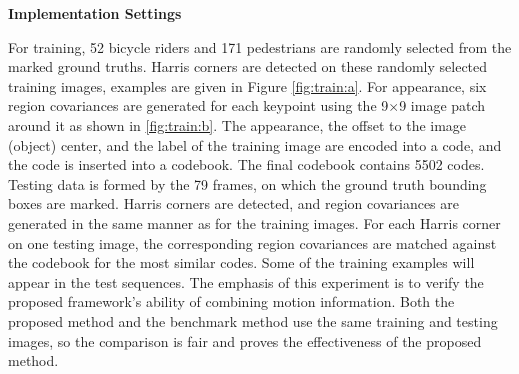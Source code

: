 \textbf{Implementation Settings}

For training, 52  bicycle riders and 171  pedestrians are randomly selected from the marked ground truths. Harris corners are detected on these randomly selected training images, examples are given in Figure \ref{fig:train:a}. For appearance, six region covariances are generated for each keypoint using the 9$\times$9 image patch around it as shown in \ref{fig:train:b}. The appearance, the offset to the image (object) center, and the label of the training image are encoded into a code, and the code is inserted into a codebook. The final codebook contains 5502 codes. Testing data is formed by the 79 frames, on which the ground truth bounding boxes are marked. Harris corners are detected, and region covariances are generated in the same manner as for the training images. For each Harris corner on one testing image, the corresponding region covariances are matched against the codebook for the most similar codes. Some of the training examples will
appear in the test sequences. The
emphasis of this experiment is  to verify the proposed
framework's ability of combining motion information. Both
the proposed method and the benchmark method use the same
training and testing images, so the comparison is fair
and proves the effectiveness of the proposed method.


